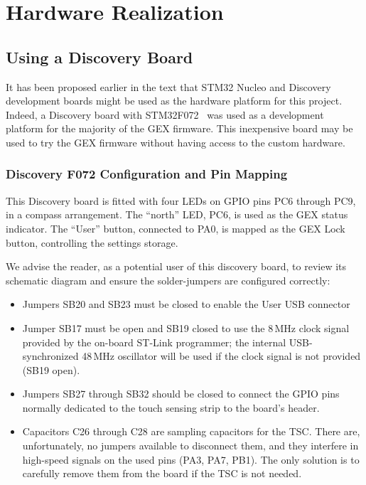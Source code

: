 \chapter{Hardware Realization}

\section{Using a Discovery Board}

It has been proposed earlier in the text that STM32 Nucleo and Discovery development boards might be used as the hardware platform for this project. Indeed, a Discovery board with STM32F072~\cite{disco-f072} was used as a development platform for the majority of the GEX firmware. This inexpensive board may be used to try the GEX firmware without having access to the custom hardware.

\subsection{Discovery F072 Configuration and Pin Mapping}

This Discovery board is fitted with four \glspl{LED} on \gls{GPIO} pins PC6 through PC9, in a compass arrangement. The ``north'' \gls{LED}, PC6, is used as the GEX status indicator. The ``User'' button, connected to PA0, is mapped as the GEX Lock button, controlling the settings storage.

We advise the reader, as a potential user of this discovery board, to review its schematic diagram and ensure the solder-jumpers are configured correctly:

\begin{itemize}
	\item Jumpers SB20 and SB23 must be closed to enable the User \gls{USB} connector
	
	\item Jumper SB17 must be open and SB19 closed to use the 8\,MHz clock signal provided by the on-board ST-Link programmer; the internal USB-synchronized 48\,MHz oscillator will be used if the clock signal is not provided (SB19 open).
	
	\item Jumpers SB27 through SB32 should be closed to connect the \gls{GPIO} pins normally dedicated to the touch sensing strip to the board's header. 
	
	\item Capacitors C26 through C28 are sampling capacitors for the \gls{TSC}. There are, unfortunately, no jumpers available to disconnect them, and they interfere in high-speed signals on the used pins (PA3, PA7, PB1). The only solution is to carefully remove them from the board if the \gls{TSC} is not needed.
\end{itemize} 

